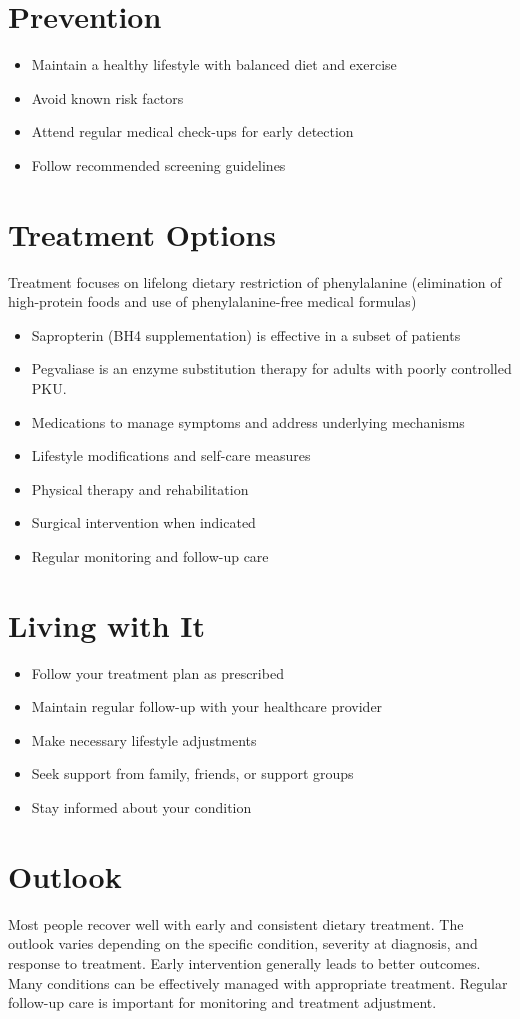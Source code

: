\section{Prevention}
\begin{itemize}[noitemsep]
  \item Maintain a healthy lifestyle with balanced diet and exercise
  \item Avoid known risk factors
  \item Attend regular medical check-ups for early detection
  \item Follow recommended screening guidelines
\end{itemize}
\section{Treatment Options}
Treatment focuses on lifelong dietary restriction of phenylalanine (elimination of high-protein foods and use of phenylalanine-free medical formulas)

\begin{itemize}[noitemsep]
  \item Sapropterin (BH4 supplementation) is effective in a subset of patients
  \item Pegvaliase is an enzyme substitution therapy for adults with poorly controlled PKU.
  \item Medications to manage symptoms and address underlying mechanisms
  \item Lifestyle modifications and self-care measures
  \item Physical therapy and rehabilitation
  \item Surgical intervention when indicated
  \item Regular monitoring and follow-up care
\end{itemize}
\section{Living with It}
\begin{itemize}[noitemsep]
  \item Follow your treatment plan as prescribed
  \item Maintain regular follow-up with your healthcare provider
  \item Make necessary lifestyle adjustments
  \item Seek support from family, friends, or support groups
  \item Stay informed about your condition
\end{itemize}
\section{Outlook}
Most people recover well with early and consistent dietary treatment. The outlook varies depending on the specific condition, severity at diagnosis, and response to treatment. Early intervention generally leads to better outcomes. Many conditions can be effectively managed with appropriate treatment. Regular follow-up care is important for monitoring and treatment adjustment.
